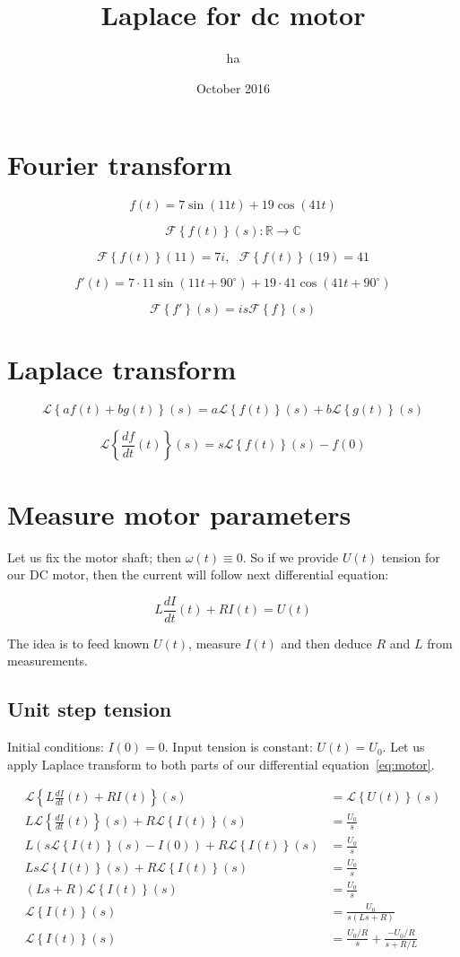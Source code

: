 \documentclass{article}
\title{Laplace for dc motor}
\author{ha}
\date{October 2016}
\newcommand{\Fourier}[1]{\mathcal{F}\left\{#1\right\}(s)}
\newcommand{\Laplace}[1]{\mathcal{L}\left\{#1\right\}(s)}
\begin{document}
\maketitle

\section{Fourier transform}
$$
f(t) = 7\sin(11 t) + 19 \cos(41 t)
$$

$$
\Fourier{f(t)} : \mathbb{R} \rightarrow \mathbb{C}
$$

$$
\mathcal{F}\left\{f(t)\right\}(11) = 7i, ~~~ \mathcal{F}\left\{f(t)\right\}(19) = 41
$$

$$
f'(t) = 7 \cdot 11 \sin(11t+90^\circ) +  19\cdot 41\cos(41t+90^\circ) 
$$

$$
\Fourier{f'} = i s \Fourier{f}
$$

\section{Laplace transform}

$$
    \Laplace{af(t) + bg(t)} = a\Laplace{f(t)} + b\Laplace{g(t)}
$$

$$
    \Laplace{\frac{df}{dt}(t)} = s\Laplace{f(t)} - f(0)
$$

\section{Measure motor parameters}

Let us fix the motor shaft; then $\omega(t)\equiv 0$.
So if we provide $U(t)$ tension for our DC motor, then the current will follow next differential equation:

\begin{equation}
    L \frac{dI}{dt}(t) + RI(t) = U(t)
\label{eq:motor}
\end{equation}

The idea is to feed known $U(t)$, measure $I(t)$ and then deduce $R$ and $L$ from measurements.

\subsection{Unit step tension}

Initial conditions: $I(0) = 0$. Input tension is constant: $U(t) = U_0$.
Let us apply Laplace transform to both parts of our differential equation~\eqref{eq:motor}. 

\begin{align*}
    \Laplace{L \frac{dI}{dt}(t) + RI(t)} & = \Laplace{U(t)} \\
    L\Laplace{\frac{dI}{dt}(t)} + R\Laplace{I(t)} & = \frac{U_0}{s} \\
    L(s\Laplace{I(t)} - I(0)) + R\Laplace{I(t)} & = \frac{U_0}{s} \\
    Ls\Laplace{I(t)} + R\Laplace{I(t)} & = \frac{U_0}{s} \\
    (Ls+R)\Laplace{I(t)}  & = \frac{U_0}{s} \\
    \Laplace{I(t)}  & = \frac{U_0}{s(Ls+R)} \\
    \Laplace{I(t)}  & = \frac{U_0/R}{s} + \frac{-U_0/R}{s+R/L}
\end{align*}
\end{document}
